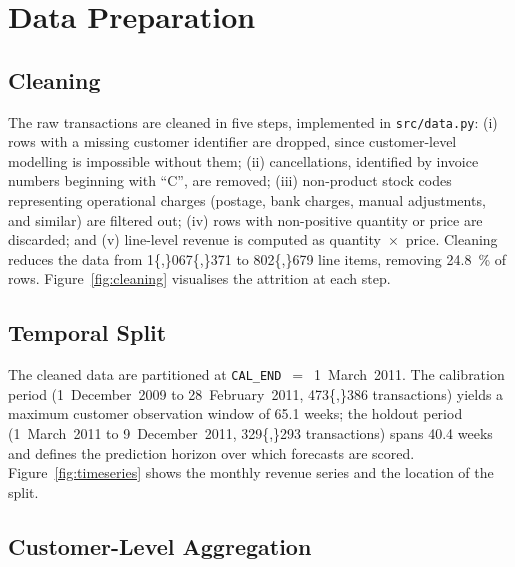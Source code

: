 \section{Data Preparation}
\label{sec:preparation}

\subsection{Cleaning}
\label{sec:cleaning}

The raw transactions are cleaned in five steps, implemented in \texttt{src/data.py}: (i) rows with a missing customer identifier are dropped, since customer-level modelling is impossible without them; (ii) cancellations, identified by invoice numbers beginning with ``C'', are removed; (iii) non-product stock codes representing operational charges (postage, bank charges, manual adjustments, and similar) are filtered out; (iv) rows with non-positive quantity or price are discarded; and (v) line-level revenue is computed as quantity~$\times$~price. Cleaning reduces the data from \num{1{,}067{,}371} to \num{802{,}679} line items, removing \SI{24.8}{\percent} of rows. Figure~\ref{fig:cleaning} visualises the attrition at each step.


\subsection{Temporal Split}
\label{sec:split}

The cleaned data are partitioned at \texttt{CAL\_END}~$=$~1~March~2011. The calibration period (1~December~2009 to 28~February~2011, \num{473{,}386} transactions) yields a maximum customer observation window of \num{65.1} weeks; the holdout period (1~March~2011 to 9~December~2011, \num{329{,}293} transactions) spans \num{40.4} weeks and defines the prediction horizon over which forecasts are scored. Figure~\ref{fig:timeseries} shows the monthly revenue series and the location of the split.


\subsection{Customer-Level Aggregation}
\label{sec:aggregation}

